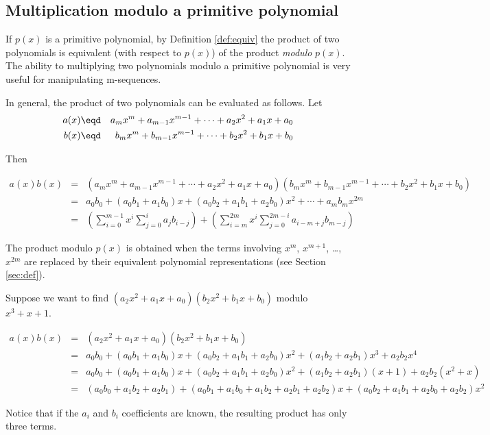 \subsection{Multiplication modulo a primitive polynomial}
\label{sec:math-xmod}
If $p(x)$ is a primitive polynomial,
by Definition \ref{def:equiv}
the product of two polynomials is equivalent (with respect to $p(x)$)
of the product {\em modulo} $p(x)$.
The ability to multiplying two polynomials modulo a primitive polynomial
is very useful for manipulating m-sequences.

In general, the product of two polynomials can be evaluated as follows.
Let 
\begin{eqnarray*}
   a(x) &\eqd& a_mx^m + a_{m-1}x^{m-1} + \cdots + a_2x^2 + a_1x + a_0 \\
   b(x) &\eqd& b_mx^m + b_{m-1}x^{m-1} + \cdots + b_2x^2 + b_1x + b_0
\end{eqnarray*}

Then 
\begin{scriptsize}
\begin{eqnarray*}
   a(x)b(x)
        &=& \left( a_mx^m + a_{m-1}x^{m-1} + \cdots + a_2x^2 + a_1x + a_0 \right)
            \left( b_mx^m + b_{m-1}x^{m-1} + \cdots + b_2x^2 + b_1x + b_0 \right)\\
        &=& a_0b_0 + (a_0b_1+a_1b_0)x + (a_0b_2+a_1b_1+a_2b_0)x^2 + \cdots + a_mb_mx^{2m}\\
        &=& \left( \sum\limits_{i=0}^{m-1}x^i \sum\limits_{j=0}^i a_jb_{i-j} \right) +
            \left( \sum\limits_{i=m}^{2m}x^i \sum\limits_{j=0}^{2m-i} a_{i-m+j}b_{m-j} \right)
\end{eqnarray*}
\end{scriptsize}

The product modulo $p(x)$ is obtained when the terms involving 
$x^m$, $x^{m+1}$, \ldots, $x^{2m}$ are replaced by their 
equivalent polynomial representations
(see Section \ref{sec:def}).

\begin{example}
\label{ex:math-xmod}
Suppose we want to find $(a_2x^2 + a_1x + a_0)(b_2x^2+b_1x+b_0)$ modulo $x^3+x+1$.
\begin{scriptsize}
\begin{eqnarray*}
   a(x)b(x) &=& (a_2x^2+a_1x+a_0)(b_2x^2+b_1x+b_0)
      \\&=& a_0b_0 + (a_0b_1 + a_1b_0)x + (a_0b_2 + a_1b_1 + a_2b_0)x^2 + 
            (a_1b_2 + a_2b_1)x^3 + a_2b_2x^4
      \\&=& a_0b_0 + (a_0b_1 + a_1b_0)x + (a_0b_2 + a_1b_1 + a_2b_0)x^2 + 
            (a_1b_2 + a_2b_1)(x+1) + a_2b_2(x^2+x)
      \\&=& (a_0b_0 + a_1b_2 + a_2b_1) + 
            (a_0b_1 + a_1b_0 + a_1b_2 + a_2b_1 + a_2b_2)x + 
            (a_0b_2 + a_1b_1 + a_2b_0 + a_2b_2)x^2 
\end{eqnarray*}
\end{scriptsize}
Notice that if the $a_i$ and $b_i$ coefficients are known, 
the resulting product has only three terms.
\end{example}


